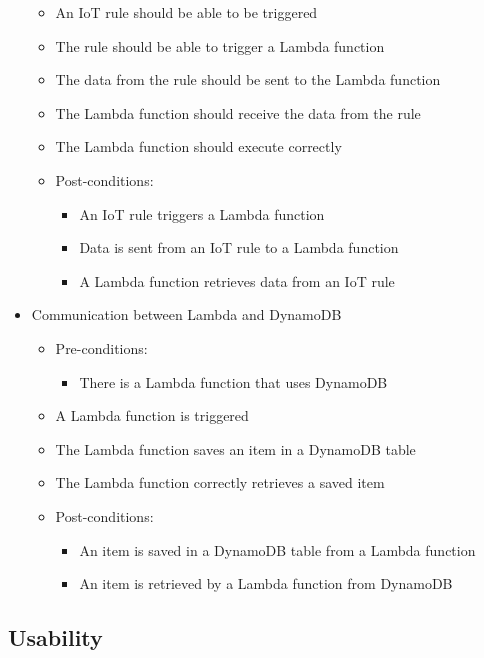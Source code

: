 \documentclass{article}
\begin{document}
\begin{itemize}
\begin{itemize}
\begin{itemize}
			\end{itemize}
			\item An IoT rule should be able to be triggered
			\item The rule should be able to trigger a Lambda function
			\item The data from the rule should be sent to the Lambda function 
			\item The Lambda function should receive the data from the rule
			\item The Lambda function should execute correctly
			\item Post-conditions:
			\begin{itemize}
				\item An IoT rule triggers a Lambda function
				\item Data is sent from an IoT rule to a Lambda function
				\item A Lambda function retrieves data from an IoT rule
			\end{itemize}
		\end{itemize}
		
		\item{Communication between Lambda and DynamoDB}
		\begin{itemize}
			\item Pre-conditions: 
			\begin{itemize}
				\item There is a Lambda function that uses DynamoDB
			\end{itemize}
			\item A Lambda function is triggered
			\item The Lambda function saves an item in a DynamoDB table
			\item The Lambda function correctly retrieves a saved item
			\item Post-conditions:
			\begin{itemize}
				\item An item is saved in a DynamoDB table from a Lambda function
				\item An item is retrieved by a Lambda function from DynamoDB
			\end{itemize}
		\end{itemize}
	\end{itemize}

	\subsection{Usability}
\end{document}
